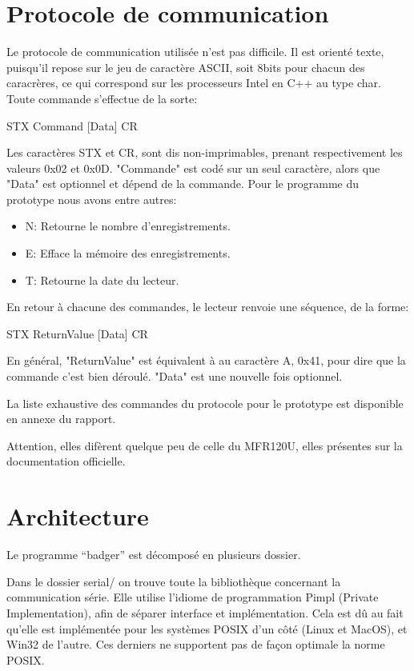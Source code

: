 \section{Protocole de communication}
    Le protocole de communication utilisée n'est pas difficile. Il est orienté 
texte, puisqu'il repose sur le jeu de caractère ASCII, soit 8bits pour chacun des
caracrères, ce qui correspond sur les processeurs Intel en C++ au type char. 
Toute commande s'effectue de la sorte:

STX Command [Data] CR

    Les caractères STX et CR, sont dis non-imprimables, prenant respectivement les
valeurs 0x02 et 0x0D. "Commande" est codé sur un seul caractère, alors que "Data"
est optionnel et dépend de la commande. Pour le programme du prototype nous avons
entre autres:

    \begin{itemize}
        \item N: Retourne le nombre d'enregistrements.
        \item E: Efface la mémoire des enregistrements.
        \item T: Retourne la date du lecteur.
    \end{itemize}

En retour à chacune des commandes, le lecteur renvoie une séquence, de la forme:

STX ReturnValue [Data] CR

    En général, "ReturnValue" est équivalent à au caractère A, 0x41, pour dire que
la commande c'est bien déroulé. "Data" est une nouvelle fois optionnel.

    La liste exhaustive des commandes du protocole pour le prototype est disponible
en annexe du rapport. 

    Attention, elles difèrent quelque peu de celle du MFR120U, elles présentes sur 
la documentation officielle.




\section{Architecture}
    Le programme ``badger'' est décomposé en plusieurs dossier. 

    Dans le dossier serial/ on trouve toute la bibliothèque concernant la communication
série. Elle utilise l'idiome de programmation Pimpl (Private Implementation), afin 
de séparer interface et implémentation. Cela est dû au fait qu'elle est implémentée
pour les systèmes POSIX d'un côté (Linux et MacOS), et Win32 de l'autre. Ces derniers
ne supportent pas de façon optimale la norme POSIX.

